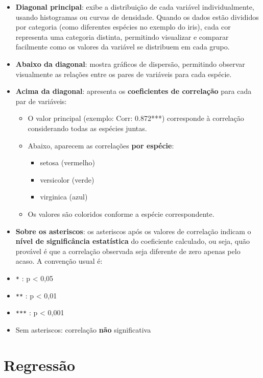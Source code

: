 \documentclass[
]{book}
\providecommand{\tightlist}{%
  \setlength{\itemsep}{0pt}\setlength{\parskip}{0pt}}
\begin{document}
\begin{itemize}
\item
  \textbf{Diagonal principal}: exibe a distribuição de cada variável individualmente, usando histogramas ou curvas de densidade. Quando os dados estão divididos por categoria (como diferentes espécies no exemplo do iris), cada cor representa uma categoria distinta, permitindo visualizar e comparar facilmente como os valores da variável se distribuem em cada grupo.
\item
  \textbf{Abaixo da diagonal}: mostra gráficos de dispersão, permitindo observar visualmente as relações entre os pares de variáveis para cada espécie.
\item
  \textbf{Acima da diagonal}: apresenta os \textbf{coeficientes de correlação} para cada par de variáveis:

  \begin{itemize}
  \tightlist
  \item
    O valor principal (exemplo: Corr: 0.872***) corresponde à correlação considerando todas as espécies juntas.
  \item
    Abaixo, aparecem as correlações \textbf{por espécie}:

    \begin{itemize}
    \tightlist
    \item
      setosa (vermelho)
    \item
      versicolor (verde)
    \item
      virginica (azul)
    \end{itemize}
  \item
    Os valores são coloridos conforme a espécie correspondente.
  \end{itemize}
\item
  \textbf{Sobre os asteriscos}: os asteriscos após os valores de correlação indicam o \textbf{nível de significância estatística} do coeficiente calculado, ou seja, quão provável é que a correlação observada seja diferente de zero apenas pelo acaso. A convenção usual é:
\item
  \texttt{*} : p \textless{} 0,05
\item
  \texttt{**} : p \textless{} 0,01
\item
  \texttt{***} : p \textless{} 0,001
\item
  Sem asteriscos: correlação \textbf{não} significativa
\end{itemize}

\chapter{Regressão}\label{regressuxe3o}
\end{document}
